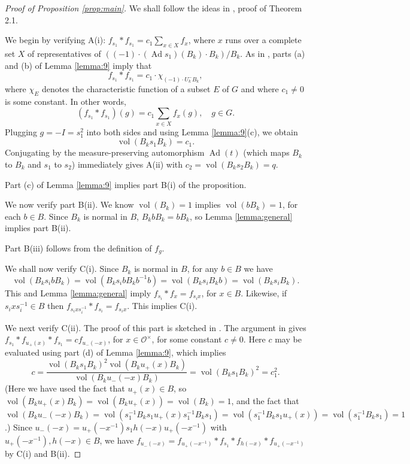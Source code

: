 \documentclass[12pt,letterpaper,reqno]{amsart}
\let\cal\mathcal
\theoremstyle{definition}
\theoremstyle{remark}
\numberwithin{equation}{section}
\begin{document}
\begin{proof}[Proof of Proposition \ref{prop:main}]
We shall follow the ideas in \cite{HM85}, proof of Theorem 2.1.

We begin by verifying A(i): $f_{s_1}*f_{s_1}=c_1\sum_{x\in X} f_x$, where $x$
runs over a complete set $X$ of representatives of
$((-1)\cdot (\operatorname{Ad} s_1)(B_k)\cdot B_k)/B_k$. As in \cite{HM85}, parts
(a) and (b) of Lemma \ref{lemma:9} imply that
\[
f_{s_1}*f_{s_1}=c_1\cdot \chi_{(-1)\cdot U^-_kB_k},
\]
where $\chi_E$ denotes the characteristic function of a subset $E$ of $G$ and
where $c_1\neq 0$ is some constant. In other words,
\[
(f_{s_1}*f_{s_1})(g)=c_1\sum_{x\in X} f_x(g),\quad g\in G.
\]
Plugging $g=-I=s_1^2$ into both sides and using Lemma \ref{lemma:9}(c), we
obtain
\[
\operatorname{vol}(B_k s_1 B_k)=c_1.
\]
Conjugating by the measure-preserving automorphism $\operatorname{Ad}(t)$
(which maps $B_k$ to $B_k$ and $s_1$ to $s_2$) immediately gives A(ii) with
$c_2=\operatorname{vol}(B_k s_2 B_k)=q$.

Part (c) of Lemma \ref{lemma:9} implies part B(i) of the proposition.

We now verify part B(ii). We know $\operatorname{vol}(B_k)=1$ implies
$\operatorname{vol}(bB_k)=1$, for each $b\in B$. Since $B_k$ is normal in $B$,
$B_kbB_k=bB_k$, so Lemma \ref{lemma:general} implies part B(ii).

Part B(iii) follows from the definition of $f_g$.

We shall now verify C(i). Since $B_k$ is normal in $B$, for any $b\in B$ we
have
\[
\operatorname{vol}(B_k s_i b B_k)=\operatorname{vol}(B_k s_i b B_k b^{-1} b)
=\operatorname{vol}(B_k s_i B_k b)=\operatorname{vol}(B_k s_i B_k).
\]
This and Lemma \ref{lemma:general} imply $f_{s_i}*f_x=f_{s_ix}$, for $x\in B$.
Likewise, if $s_ixs_i^{-1}\in B$ then
$f_{s_ixs_i^{-1}}*f_{s_i}=f_{s_ix}$. This implies C(i).

We next verify C(ii). The proof of this part is sketched in \cite{HM85}. The
argument in \cite{HM85} gives $f_{s_1}*f_{u_+(x)}*f_{s_1}=c f_{u_-(-x)}$, for
$x\in {\cal O}^\times$, for some constant $c\neq 0$. Here $c$ may be evaluated
using part (d) of Lemma \ref{lemma:9}, which implies
\[
c=\frac{\operatorname{vol}(B_k s_1 B_k)^2\operatorname{vol}(B_k u_+(x) B_k)}
{\operatorname{vol}(B_k u_-(-x) B_k)}
=\operatorname{vol}(B_k s_1 B_k)^2 = c_1^2.
\]
(Here we have used the fact that $u_+(x)\in B$, so
$\operatorname{vol}(B_k u_+(x) B_k)=\operatorname{vol}(B_k u_+(x))
=\operatorname{vol}(B_k)=1$, and the fact that
$\operatorname{vol}(B_k u_-(-x) B_k)
=\operatorname{vol}(s_1^{-1}B_ks_1 u_+(x) s_1^{-1}B_ks_1)
=\operatorname{vol}(s_1^{-1}B_ks_1 u_+(x))
=\operatorname{vol}(s_1^{-1}B_ks_1)=1$.) Since
$u_-(-x)=u_+(-x^{-1})s_1 h(-x)u_+(-x^{-1})$ with $u_+(-x^{-1}), h(-x)\in B$,
we have $f_{u_-(-x)}=f_{u_+(-x^{-1})}*f_{s_1}*f_{h(-x)}*f_{u_+(-x^{-1})}$ by
C(i) and B(ii).


\end{proof}
\end{document}

